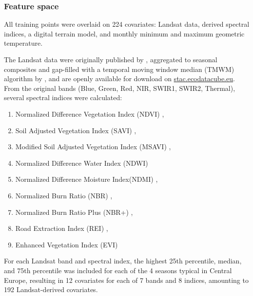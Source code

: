     \subsubsection{Feature space}
        All training points were overlaid on 224 covariates: Landsat data, derived spectral indices, a digital terrain model, and monthly minimum and maximum geometric temperature. 
        
        The Landsat data were originally published by \citet{potapov2020landsat}, aggregated to seasonal composites and gap-filled with a temporal moving window median (TMWM) algorithm by \citet{witjes2023ecodatacube}, and are openly available for download on \url{stac.ecodatacube.eu}. From the original bands (Blue, Green, Red, NIR, SWIR1, SWIR2, Thermal), several spectral indices were calculated: 
        \begin{enumerate}
            \item Normalized Difference Vegetation Index (NDVI) \citep{rouse1974monitoring}, 
            \item Soil Adjusted Vegetation Index (SAVI) \citep{huete1988soil}, 
            \item Modified Soil Adjusted Vegetation Index (MSAVI) \citep{qi1994modified}, 
            \item Normalized Difference Water Index (NDWI)  \citep{mcfeeters1996use}
            \item Normalized Difference Moisture Index(NDMI) \citep{gao1996ndwi},
            \item Normalized Burn Ratio (NBR) \citep{garcia1991mapping}, 
            \item Normalized Burn Ratio Plus (NBR+) \citep{alcaras2022normalized},
            \item Road Extraction Index (REI) \citep{shahi2015novel}, 
            \item Enhanced Vegetation Index (EVI) \citep{liu1995feedback}
        \end{enumerate}
        For each Landsat band and spectral index, the highest 25th percentile, median, and 75th percentile was included for each of the 4 seasons typical in Central Europe, resulting in 12 covariates for each of 7 bands and 8 indices, amounting to 192 Landsat-derived covariates.

